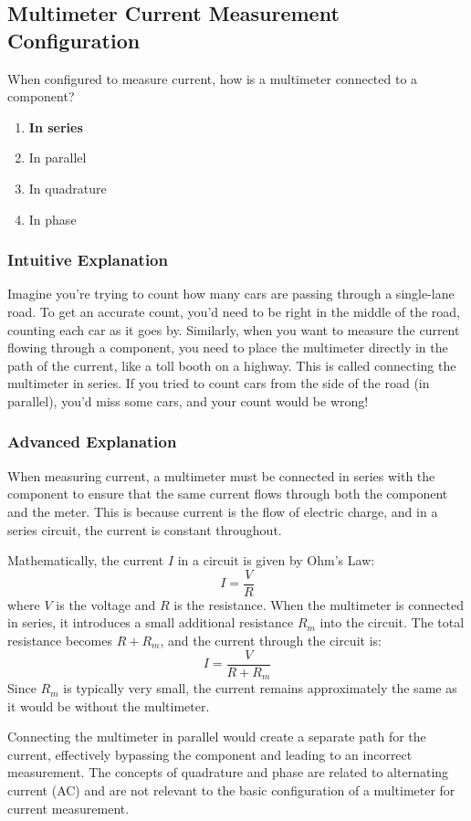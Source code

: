 \subsection{Multimeter Current Measurement Configuration}
\label{T7D03}

\begin{tcolorbox}[colback=gray!10!white,colframe=black!75!black,title=T7D03]
When configured to measure current, how is a multimeter connected to a component?
\begin{enumerate}[label=\Alph*)]
    \item \textbf{In series}
    \item In parallel
    \item In quadrature
    \item In phase
\end{enumerate}
\end{tcolorbox}

\subsubsection{Intuitive Explanation}
Imagine you're trying to count how many cars are passing through a single-lane road. To get an accurate count, you’d need to be right in the middle of the road, counting each car as it goes by. Similarly, when you want to measure the current flowing through a component, you need to place the multimeter directly in the path of the current, like a toll booth on a highway. This is called connecting the multimeter in series. If you tried to count cars from the side of the road (in parallel), you’d miss some cars, and your count would be wrong!

\subsubsection{Advanced Explanation}
When measuring current, a multimeter must be connected in series with the component to ensure that the same current flows through both the component and the meter. This is because current is the flow of electric charge, and in a series circuit, the current is constant throughout. 

Mathematically, the current \( I \) in a circuit is given by Ohm's Law:
\[
I = \frac{V}{R}
\]
where \( V \) is the voltage and \( R \) is the resistance. When the multimeter is connected in series, it introduces a small additional resistance \( R_m \) into the circuit. The total resistance becomes \( R + R_m \), and the current through the circuit is:
\[
I = \frac{V}{R + R_m}
\]
Since \( R_m \) is typically very small, the current remains approximately the same as it would be without the multimeter.

Connecting the multimeter in parallel would create a separate path for the current, effectively bypassing the component and leading to an incorrect measurement. The concepts of quadrature and phase are related to alternating current (AC) and are not relevant to the basic configuration of a multimeter for current measurement.

